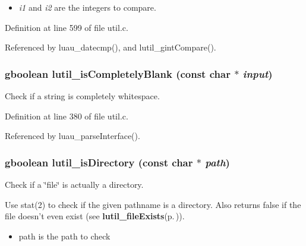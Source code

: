 \begin{itemize}
\item {\em i1\/} and {\em i2\/} are the integers to compare. 
\end{itemize}


Definition at line 599 of file util.c.

Referenced by luau\_\-datecmp(), and lutil\_\-gint\-Compare().
\subsubsection{\setlength{\rightskip}{0pt plus 5cm}gboolean lutil\_\-is\-Completely\-Blank (const char $\ast$ {\em input})}\label{util_8c_a10}


Check if a string is completely whitespace. 



Definition at line 380 of file util.c.

Referenced by luau\_\-parse\-Interface().
\subsubsection{\setlength{\rightskip}{0pt plus 5cm}gboolean lutil\_\-is\-Directory (const char $\ast$ {\em path})}\label{util_8c_a18}


Check if a \char`\"{}file\char`\"{} is actually a directory. 

Use stat(2) to check if the given pathname is a directory. Also returns false if the file doesn't even exist (see {\bf lutil\_\-file\-Exists}{\rm (p.\,\pageref{util_8h_a27})}).

\begin{itemize}
\item path is the path to check 
\end{itemize}


